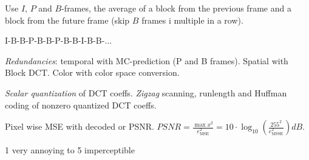 \pagebreak
\begin{definition}
  Use \(I\), \(P\) and \(B\)-frames, the average of a block from the previous frame and a block from the future frame (skip \(B\) frames i multiple in a row).
\end{definition}

\begin{algorithm}
  {\color{H1}I-B-B-P-B-B-P-B-B}-{\color{H3}I-B-B-\(\ldots\)}
\end{algorithm}

\begin{definition}
  \textit{Redundancies}: temporal with MC-prediction (P and B frames).
  Spatial with Block DCT.
  Color with color space conversion.

  \textit{Scalar quantization} of DCT coeffs. \textit{Zigzag} scanning, runlength and Huffman coding of nonzero quantized DCT coeffs.
\end{definition}

\begin{definition}
  Pixel wise MSE with decoded or PSNR.
  \(PSNR = \frac{\max x^2}{e_{\text{MSE}}^2} = 10 \cdot \log_10 (\frac{255^2}{e^2_{\text{MSSE}}}) dB\).
\end{definition}

\begin{definition}
  1 very annoying to 5 imperceptible
\end{definition}

